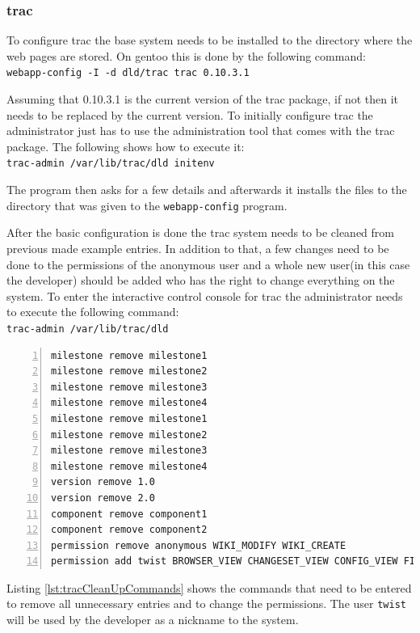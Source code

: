    \subsubsection{trac}
    To configure trac the base system needs to be installed to the directory where the web pages are stored. On gentoo this is done by the following command:\\
    \verb=webapp-config -I -d dld/trac trac 0.10.3.1=

    Assuming that 0.10.3.1 is the current version of the trac package, if not then it needs to be replaced by the current version. To initially configure trac the administrator just has to use the administration tool that comes with the trac package. The following shows how to execute it:\\
    \verb=trac-admin /var/lib/trac/dld initenv=

    The program then asks for a few details and afterwards it installs the files to the directory that was given to the \verb=webapp-config= program.

    After the basic configuration is done the trac system needs to be cleaned from previous made example entries. In addition to that, a few changes need to be done to the permissions of the anonymous user and a whole new user(in this case the developer) should be added who has the right to change everything on the system. To enter the interactive control console for trac the administrator needs to execute the following command:\\
    \verb=trac-admin /var/lib/trac/dld=

    \begin{lstlisting}[frame=single,breaklines,basicstyle=\footnotesize,numbers=left,label=lst:tracCleanUpCommands,captionpos=b,caption={clean up command for the trac administration console}]
milestone remove milestone1
milestone remove milestone2
milestone remove milestone3
milestone remove milestone4
milestone remove milestone1
milestone remove milestone2
milestone remove milestone3
milestone remove milestone4
version remove 1.0
version remove 2.0
component remove component1
component remove component2
permission remove anonymous WIKI_MODIFY WIKI_CREATE
permission add twist BROWSER_VIEW CHANGESET_VIEW CONFIG_VIEW FILE_VIEW LOG_VIEW MILESTONE_ADMIN MILESTONE_CREATE MILESTONE_DELETE MILESTONE_MODIFY MILESTONE_VIEW REPORT_ADMIN REPORT_CREATE REPORT_DELETE REPORT_MODIFY REPORT_SQL_VIEW REPORT_VIEW ROADMAP_ADMIN ROADMAP_VIEW SEARCH_VIEW TICKET_ADMIN TICKET_APPEND TICKET_CHGPROP TICKET_CREATE TICKET_MODIFY  TICKET_VIEW TIMELINE_VIEW TRAC_ADMIN WIKI_ADMIN WIKI_CREATE WIKI_DELETE WIKI_MODIFY WIKI_VIEW
    \end{lstlisting}
    Listing \ref{lst:tracCleanUpCommands} shows the commands that need to be entered to remove all unnecessary entries and to change the permissions. The user \verb=twist= will be used by the developer as a nickname to the system.

